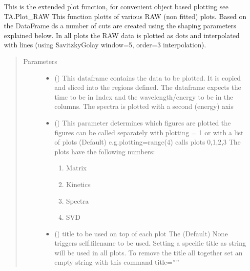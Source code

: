 \documentclass[letterpaper,10pt,english]{sphinxmanual}
\begin{document}
\begin{fulllineitems}
This is the extended plot function, for convenient object based plotting see TA.Plot\_RAW
This function plotts of various RAW (non fitted) plots. Based on the DataFrame ds a number of
cuts are created using the shaping parameters explained below.
In all plots the RAW data is plotted as dots and interpolated with lines
(using Savitzky\sphinxhyphen{}Golay window=5, order=3 interpolation).
\begin{quote}\begin{description}
\item[{Parameters}] \leavevmode\begin{itemize}
\item {} 
 () \textendash{} This dataframe contains the data to be plotted. It is copied and sliced into the
regions defined. The dataframe expects the time to be in Index and the wavelength/energy
to be in the columns. The spectra is plotted with a second (energy) axis

\item {} 
 (\sphinxstyleliteralemphasis{\sphinxupquote{ (}}\sphinxstyleliteralemphasis{\sphinxupquote{)}}\sphinxstyleliteralemphasis{\sphinxupquote{, }}) \textendash{} 
This parameter determines which figures are plotted
the figures can be called separately with plotting = 1
or with a list of plots (Default) e.g.plotting=range(4) calls plots 0,1,2,3
The plots have the following numbers:
\begin{enumerate}
%
\setcounter{enumi}{-1}
\item {} 
Matrix

\item {} 
Kinetics

\item {} 
Spectra

\item {} 
SVD

\end{enumerate}


\item {} 
 () \textendash{} title to be used on top of each plot
The (Default) None triggers  self.filename to be used. Setting a specific title as string will
be used in all plots. To remove the title all together set an empty string with this command title=””


\end{itemize}
\end{description}
\end{quote}
\end{fulllineitems}
\end{document}
